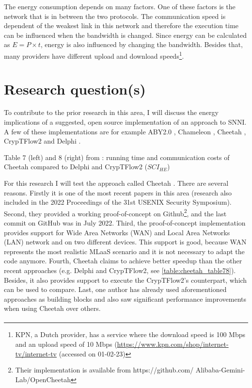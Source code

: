 \documentclass[../thesis.tex]{subfiles}
\begin{document}
The energy consumption depends on many factors. One of these factors is the network that is in between the two protocols. The communication speed is dependent of the weakest link in this network and therefore the execution time can be influenced when the bandwidth is changed. Since energy can be calculated as $E=P\times t$, energy is also influenced by changing the bandwidth. Besides that, many providers have different upload and download speeds\footnote{KPN, a Dutch provider, has a service where the download speed is 100 Mbps and an upload speed of 10 Mbps (\url{https://www.kpn.com/shop/internet-tv/internet-tv} (accessed on 01-02-23)\label{fnote:providers}}. 

\section{Research question(s)}
To contribute to the prior research in this area, I will discuss the energy implications of a suggested, open source implementation of an approach to SNNI. A few of these implementations are for example ABY2.0 \parencite{aby20}, Chameleon \parencite{chameleon}, Cheetah \parencite{cheetah}, CrypTFlow2 \parencite{cryptflow2} and Delphi \parencite{delphi}. 

\begin{table}
    \begin{adjustbox}{width=\columnwidth,center}
        
        \quad
        
    \end{adjustbox}
    \caption{Table 7 (left) and 8 (right) from \parencite[p. 821]{cheetah}: running time and communication costs of Cheetah compared to Delphi and CrypTFlow2 (\textit{${SCI}_{HE}$})}
    \label{table:cheetah_table78}
\end{table}

For this research I will test the approach called Cheetah \parencite{cheetah}. There are several reasons. Firstly it is one of the most recent papers in this area (research also included in the 2022 Proceedings of the 31st USENIX Security Symposium). Second, they provided a working proof-of-concept on Github\footnote{Their implementation is available from https://github.com/
Alibaba-Gemini-Lab/OpenCheetah}, and the last commit on GitHub was in July 2022. Third, the proof-of-concept implementation provides support for Wide Area Networks (WAN) and Local Area Networks (LAN) network and on two different devices. This support is good, because WAN represents the most realistic MLaaS scenario \parencite{ribeiro2015mlaasml} and it is not necessary to adapt the code anymore. Fourth, Cheetah claims to achieve better speedup than the other recent approaches (e.g. Delphi and CrypTFlow2, see \autoref{table:cheetah_table78}). Besides, it also provides support to execute the CrypTFlow2's counterpart, which can be used to compare. Last, one author \parencite{dong2022} has already used aforementioned approaches as building blocks and also saw significant performance improvements when using Cheetah over others. \paragraph{}
\end{document}
